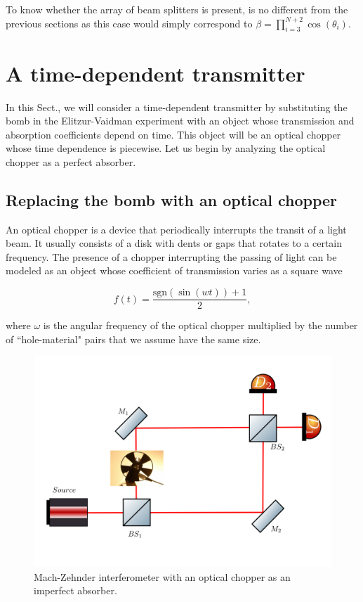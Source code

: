 \documentclass[12pt]{book}
\begin{document}
To know whether the array of beam splitters is present, is no different from the previous sections as this case would simply correspond to $\beta=\prod_{i=3}^{N+2} \cos(\theta_{i})$.


\section{A time-dependent transmitter}

In this Sect., we will consider a time-dependent transmitter by substituting the bomb in the Elitzur-Vaidman experiment with an object whose transmission and absorption coefficients depend on time. This object will be an optical chopper whose time dependence is piecewise. Let us begin by analyzing the optical chopper as a perfect absorber.

\subsection{Replacing the bomb with an optical chopper }
 

An optical chopper is a device that periodically interrupts the transit of a light beam. It usually consists of a disk with dents or gaps that rotates to a certain frequency. The presence of a chopper interrupting the passing of light can be modeled as an object whose coefficient of transmission  varies as a square wave  

\begin{equation}
f(t)=\frac{\mathrm{sgn}(\sin(wt))+1}{2},
\end{equation}

 where $\omega$ is the angular frequency of the optical chopper multiplied by the number of ``hole-material" pairs that we assume have the same size.

 \begin{figure}[t!]
\centering
\includegraphics[width=\linewidth]{images/machzenhderchopper.png}
\caption{Mach-Zehnder interferometer with an optical chopper as an imperfect absorber.}
\label{chopper}
\end{figure}
\end{document}
